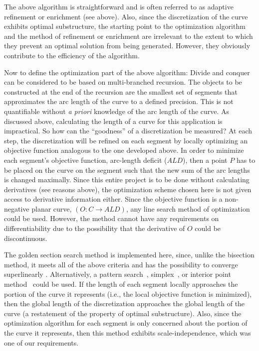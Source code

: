 The above algorithm is straightforward and is often referred to as 
adaptive refinement or enrichment (see above). Also, since the 
discretization of the curve exhibits optimal substructure, the starting 
point to the optimization algorithm and the method of refinement or 
enrichment are irrelevant to the extent to which they prevent an optimal 
solution from being generated. However, they obviously contribute 
to the efficiency of the algorithm.

Now to define the optimization part of the above algorithm: Divide and 
conquer can be considered to be based on multi-branched recursion. The 
objects to be constructed at the end of the recursion are the smallest set 
of segments that approximates the arc length of the curve to a defined 
precision. This is not quantifiable without {\it{a priori}} knowledge 
of the arc length of the curve. As discussed above, calculating the length 
of a curve for this application is impractical. So how can the 
``goodness'' of a discretization be measured?  At each step, the 
discretization will be refined on each segment by locally optimizing an 
objective function analogous to the one developed above. In order to 
minimize each segment's objective function, arc-length deficit ($ALD$), 
then a point $P$ has to be placed on the curve on the segment such 
that the new sum of the arc lengths is changed maximally. Since this 
entire project is to be done without calculating derivatives (see reasons 
above), the optimization scheme chosen here is not given access to 
derivative information either. Since the objective function is a 
non-negative planar curve, $(O: C \rightarrow ALD)$, any line search 
method of optimization could be used. However, the method cannot have any 
requirements on differentiability due to the possibility that the 
derivative of $O$ could be discontinuous.

The golden section search method is implemented here, since, unlike the 
bisection method, it meets all of the above criteria and has the 
possibility to converge superlinearly \cite{brent73}.  Alternatively, a 
pattern search~\cite{hopspack}, simplex~\cite{dantzig1,dantzig2}, or 
interior point method~\cite{karmarkar} could be used.  If the length of 
each segment 
locally approaches the portion of the curve it represents (i.e., the 
local objective function is 
minimized), then the global length of the discretization approaches the 
global length of the curve (a restatement of the property of optimal 
substructure). Also, since the optimization algorithm for each segment is 
only concerned about the portion of the curve it represents, then this 
method exhibits scale-independence, which was one of our requirements.

